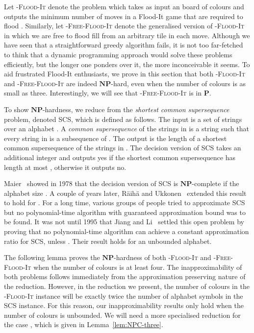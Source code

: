 \documentclass[a4paper,11pt]{llncs}
\newcounter{l}
\newcommand{\Ptime}{\ensuremath{\mathbf{P}}}
\newcommand{\NPtime}{\ensuremath{\mathbf{NP}}}
\newcommand{\Coloroid}[1]{-\textsc{Flood-It}}
\newcommand{\ColoroidFree}[1]{-\textsc{Free-Flood-It}}
\newcommand{\SCS}{\textsc{SCS}}
\newcommand{\recdim}[2]{}
\begin{document}
Let \Coloroid{c} denote the problem which takes as input an \recdim{n}{n} board  of  colours and outputs the minimum number of moves  in a Flood-It game that are required to flood . Similarly, let \ColoroidFree{c} denote the generalised version of \Coloroid{c} in which we are free to flood fill from an arbitrary tile in each move. Although we have seen that a straightforward greedy algorithm fails, it is not too far-fetched to think that a dynamic programming approach would solve these problems efficiently, but the longer one ponders over it, the more inconceivable it seems. To aid frustrated Flood-It enthusiasts, we prove in this section that both \Coloroid{c} and \ColoroidFree{c} are indeed \NPtime-hard, even when the number of colours is as small as three. Interestingly, we will see that \ColoroidFree{2} is in \Ptime.

To show \NPtime-hardness, we reduce from the \emph{shortest common supersequence} problem, denoted \SCS{}, which is defined as follows. The input is a set  of  strings over an alphabet . A \emph{common supersequence}  of the strings in  is a string such that every string in  is a subsequence of . The output is the length of a shortest common supersequence of the strings in . The decision version of \SCS{} takes an additional integer  and outputs yes if the shortest common supersequence has length at most , otherwise it outputs no.

Maier~\cite{Mai1978:SCS} showed in 1978 that the decision version of \SCS{} is \NPtime-complete if the alphabet size . A couple of years later, R\"aih\"a and Ukkonen~\cite{RU1981:SCS} extended this result to hold for . For a long time, various groups of people tried to approximate \SCS{} but no polynomial-time algorithm with guaranteed approximation bound was to be found. It was not until 1995 that Jiang and Li~\cite{JM1995:SCS} settled this open problem by proving that no polynomial-time algorithm can achieve a constant approximation ratio for \SCS{}, unless . Their result holds for an unbounded alphabet.

The following lemma proves the \NPtime-hardness of both \Coloroid{c} and \ColoroidFree{c} when the number of colours is at least four. The inapproximability of both problems follows immediately from the approximation preserving nature of the reduction. However, in the reduction we present, the number of colours in the \Coloroid{c} instance will be exactly twice the number of alphabet symbols in the \SCS{} instance. For this reason, our inapproximability results only hold when the number of colours is unbounded. We will need a more specialised reduction for the case , which is given in Lemma~\ref{lem:NPC-three}.
\end{document}
